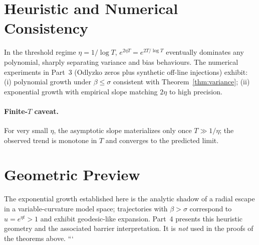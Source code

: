 \section{Heuristic and Numerical Consistency}\label{sec:numerics}

In the threshold regime $\eta=1/\log T$, $e^{2\eta T}=e^{2T/\log T}$ eventually dominates any
polynomial, sharply separating variance and bias behaviours.  The numerical experiments in
Part~3 (Odlyzko zeros plus synthetic off-line injections) exhibit:
(i) polynomial growth under $\beta\le\sigma$ consistent with Theorem~\ref{thm:variance};
(ii) exponential growth with empirical slope matching $2\eta$ to high precision.

\paragraph{Finite-$T$ caveat.}
For very small $\eta$, the asymptotic slope materializes only once $T\gg 1/\eta$; the observed
trend is monotone in $T$ and converges to the predicted limit.

\section{Geometric Preview}\label{sec:geom-preview}

The exponential growth established here is the analytic shadow of a radial escape in a
variable-curvature model space; trajectories with $\beta>\sigma$ correspond to $u=e^{\eta t}>1$
and exhibit geodesic-like expansion.  Part~4 presents this heuristic geometry and the associated
barrier interpretation.  It is \emph{not} used in the proofs of the theorems above.
```
